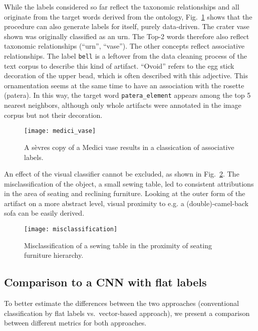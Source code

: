 While the labels considered so far reflect the taxonomic relationships and all originate from the target words derived from the ontology, Fig.~\ref{fig:medici_vase} shows that the procedure can also generate labels for itself, purely data-driven. The crater vase shown was originally classified as an urn. The Top-2 words therefore also reflect taxonomic relationships (\enquote{urn}, \enquote{vase}). The other concepts reflect associative relationships. The label \texttt{bell} is a leftover from the data cleaning process of the text corpus to describe this kind of artifact. \enquote{Ovoid} refers to the egg stick decoration of the upper bead, which is often described with this adjective. This ornamentation seems at the same time to have an association with the rosette (patera). In this way, the target word \texttt{patera\_element} appears among the top 5 nearest neighbors, although only whole artifacts were annotated in the image corpus but not their decoration.


\begin{figure}
    \centering
    \texttt{[image: medici\_vase]}
    \caption{A sèvres copy of a Medici vase results in a classication of associative labels.}
    \label{fig:medici_vase}
\end{figure}


An effect of the visual classifier cannot be excluded, as shown in Fig.~\ref{fig:misclassification}. The misclassification of the object, a small sewing table, led to consistent attributions in the area of seating and reclining furniture. Looking at the outer form of the artifact on a more abstract level, visual proximity to e.g. a (double)-camel-back sofa can be easily derived.


\begin{figure}
    \centering
    \texttt{[image: misclassification]}
    \caption{Misclassification of a sewing table in the proximity of seating furniture hierarchy.}
    \label{fig:misclassification}
\end{figure}


\subsection{Comparison to a CNN with flat labels}

To better estimate the differences between the two approaches (conventional classification by flat labels vs.~vector-based approach), we present a comparison between different metrics for both approaches.

